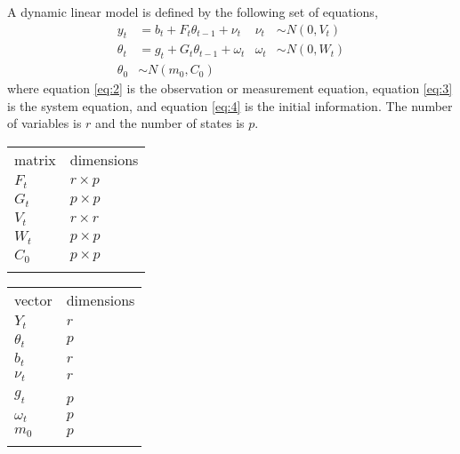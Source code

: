 \documentclass{article}\usepackage[]{graphicx}\usepackage[]{color}
\begin{document}
A dynamic linear model is defined by the following set of equations,
\begin{align}
  \label{eq:2}
  y_t &= b_{t} + F_t \theta_{t-1} + \nu_t & \nu_t & \sim N(0, V_t) \\
  \label{eq:3}
  \theta_t &= g_{t} + G_t \theta_{t-1} + \omega_t & \omega_t & \sim N(0, W_t) \\
  \label{eq:4}
  \theta_0 &\sim N(m_0, C_0)
\end{align}
where equation \ref{eq:2} is the observation or measurement equation,
equation \ref{eq:3} is the system equation, 
and equation \ref{eq:4} is the initial information.
The number of variables is $r$ and the number of states is $p$.

\begin{table}
  \centering
  \begin{tabular}[c]{@{}ll@{}}
    \hline\noalign{\medskip}
    matrix & dimensions
    \\\noalign{\medskip}
    \hline\noalign{\medskip}
    $F_t$ & $r \times p$
    \\\noalign{\medskip}
    $G_t$ & $p \times p$
    \\\noalign{\medskip}
    $V_t$ & $r \times r$
    \\\noalign{\medskip}
    $W_t$ & $p \times p$
    \\\noalign{\medskip}
    $C_0$ & $p \times p$
    \\\noalign{\medskip}
    \hline
  \end{tabular}
\end{table}

\begin{table}
  \centering
  \begin{tabular}[c]{@{}ll@{}}
    \hline\noalign{\medskip}
    vector & dimensions
    \\\noalign{\medskip}
    \hline\noalign{\medskip}
    $Y_t$ & $r$
    \\\noalign{\medskip}
    $\theta_t$ & $p$
    \\\noalign{\medskip}
    $b_t$ & $r$
    \\\noalign{\medskip}
    $\nu_t$ & $r$
    \\\noalign{\medskip}
    $g_t$ & $p$\
    \\\noalign{\medskip}
    $\omega_t$ & $p$
    \\\noalign{\medskip}
    $m_0$ & $p$
    \\\noalign{\medskip}
    \hline
  \end{tabular}
\end{table}
\end{document}
